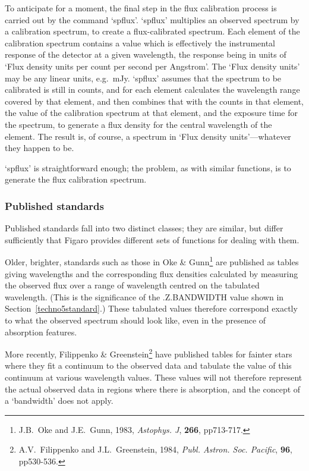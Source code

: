 \documentclass[11pt,twoside]{article}
\newcommand{\htmlref}[2]{#1}
\newcommand{\latorhtm}[2]{#1}
\newcommand{\latorhtm}[2]{#2}
\begin{document}
   To anticipate for a moment, the final step in the flux calibration
   process is carried out by the command `spflux'.  `spflux' multiplies
   an observed spectrum by a calibration spectrum, to create a
   flux-calibrated spectrum.  Each element of the calibration spectrum
   contains a value which is effectively the instrumental response of
   the detector at a given wavelength, the response being in units of
   `Flux density units per count per second per Angstrom'.  The `Flux
   density units' may be any linear units, e.g.\ mJy.  `spflux' assumes
   that the spectrum to be calibrated is still in counts, and for each
   element calculates the wavelength range covered by that element, and
   then combines that with the counts in that element, the value of the
   calibration spectrum at that element, and the exposure time for the
   spectrum, to generate a flux density for the central wavelength of
   the element.  The result is, of course, a spectrum in `Flux density
   units'\latorhtm{---}{-}whatever they happen to be.

   `spflux' is straightforward enough; the problem, as with similar
   functions, is to generate the flux calibration spectrum.


\subsubsection{\label{techno5published}Published standards}

   Published standards fall into two distinct classes; they are similar,
   but differ sufficiently that Figaro provides different sets of
   functions for dealing with them.

   Older, brighter, standards such as those in Oke \&
   Gunn\footnote{J.B.~Oke and J.E.~Gunn, 1983, {\it Astophys. J},
   {\bf 266}, pp713-717.}
   are published as tables giving wavelengths and the corresponding flux
   densities calculated by measuring the observed flux over a range of
   wavelength centred on the tabulated wavelength.  (This is the
   significance of the .Z.BANDWIDTH value shown in
   \latorhtm{Section~\ref{techno5standard}.)}
   {the section on \htmlref{standard files.)}{techno5standard}}
   These tabulated values therefore correspond exactly to what the
   observed spectrum should look like, even in the presence of
   absorption features.

   More recently, Filippenko \& Greenstein\footnote{A.V.~Filippenko and
   J.L.~Greenstein, 1984, {\it Publ. Astron. Soc. Pacific}, {\bf 96},
   pp530-536.} have published tables for fainter stars where they fit a
   continuum to the observed data and tabulate the value of this continuum
   at various wavelength values.  These values will not therefore represent
   the actual observed data in regions where there is absorption, and the
   concept of a `bandwidth' does not apply.
\end{document}
